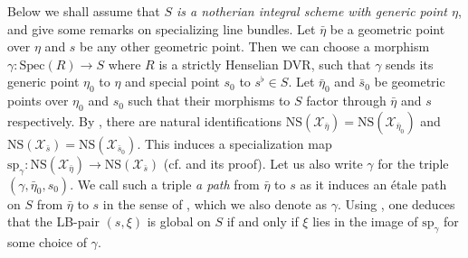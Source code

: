 \documentclass[letter, 11pt]{article}
\theoremstyle{plain}
\theoremstyle{definition}
\newcommand{\Spec}{\mathrm{Spec}}
\newcommand{\<}{\langle}
\renewcommand{\>}{\rangle}
\newcommand{\sX}{\mathcal{X}}
\newcommand{\NS}{\mathrm{NS}}
\begin{document}
\subsubsection{} \label{sec: specialization} Below we shall assume that \textit{$S$ is a notherian integral scheme with generic point $\eta$}, and give some remarks on specializing line bundles. Let $\bar{\eta}$ be a geometric point over $\eta$ and $s$ be any other geometric point. Then we can choose a morphism $\gamma : \Spec(R) \to S$ where $R$ is a strictly Henselian DVR, such that $\gamma$ sends its generic point $\eta_0$ to $\eta$ and special point $s_0$ to $s^\flat \in S$. Let $\bar{\eta}_0$ and $\bar{s}_0$ be geometric points over $\eta_0$ and $s_0$ such that their morphisms to $S$ factor through $\bar{\eta}$ and $s$ respectively. By \cite[Prop.~3.1]{MPJumping}, there are natural identifications $\NS(\sX_{\bar{\eta}}) = \NS(\sX_{\bar{\eta}_0})$ and $\NS(\sX_{\bar{s}}) = \NS(\sX_{\bar{s}_0})$. This induces a specialization map $\mathrm{sp}_\gamma : \NS(\sX_{\bar{\eta}}) \to \NS(\sX_{\bar{s}})$ (cf. \cite[Prop.~3.6]{MPJumping} and its proof). Let us also write $\gamma$ for the triple $(\gamma, \bar{\eta}_0, s_0)$.  We call such a triple \textit{a path} from $\bar{\eta}$ to $s$ as it induces an \'etale path on $S$ from $\bar{\eta}$ to $s$ in the sense of \cite[Tag~03VD]{stacks-project}, which we also denote as $\gamma$. Using \cite[054F]{stacks-project}, one deduces that the LB-pair $(s, \xi)$ is global on $S$ if and only if $\xi$ lies in the image of $\mathrm{sp}_\gamma$ for some choice of $\gamma$. 
\end{document}
